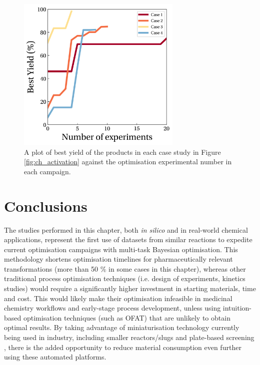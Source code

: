 \begin{figure}
    \centering
    \includegraphics[width=0.7\textwidth]{gfx/Chapter04/ch_activation_optimization_curves.png}
    \caption{A plot of best yield of the products in each case study in Figure \ref{fig:ch_activation} against the optimisation experimental number in each campaign.}
    \label{fig:optimisation_curves}
\end{figure}


\section{Conclusions}

The studies performed in this chapter, both \textit{in silico} and in real-world chemical applications, represent the first use of datasets from similar reactions to expedite current optimisation campaigns with multi-task Bayesian optimisation. This methodology shortens optimisation timelines for pharmaceutically relevant transformations (more than 50 \% in some cases in this chapter), whereas other traditional process optimisation techniques (i.e. design of experiments, kinetics studies) would require a significantly higher investment in starting materials, time and cost. This would likely make their optimisation infeasible in medicinal chemistry workflows and early-stage process development, unless using intuition-based optimisation techniques (such as OFAT) that are unlikely to obtain optimal results. By taking advantage of miniaturisation technology currently being used in industry, including smaller reactors/slugs \cite{Baumgartner2019} and plate-based screening \cite{BuitragoSantanilla2015}, there is the added opportunity to reduce material consumption even further using these automated platforms. 

